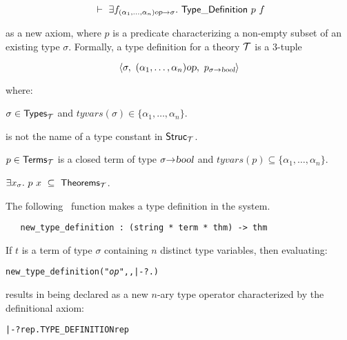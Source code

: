 \[\turn \equant{f_{(\alpha_1,\ldots,\alpha_n)\ty{op}\fun\sigma}}\TyDef\ p\ f\]

\noindent as a new axiom, where $p$ is a predicate
characterizing a
non-empty subset of an existing type $\sigma$.  Formally, a type definition
for a theory ${\cal T}$ is a $3$-tuple

\[ \langle \sigma,\ (\alpha_1,\ldots,\alpha_n)\ty{op},
    \ p_{\sigma\fun\ty{bool}}\rangle \]

\noindent where:

\begin{myenumerate}
\item $\sigma\in{\sf Types}_{\cal T}$  and
$tyvars(\sigma)\in\{\alpha_1, \ldots , \alpha_n\}$.
\item {} is not the name of a type constant in ${\sf Struc}_{\cal T}$.
\item $p\in{\sf Terms}_{\cal T}$ is a closed term of
type $\sigma{\to}\textsl{bool}$  and
$tyvars(p)\subseteq\{\alpha_1, \ldots , \alpha_n\}$.
\item $\exists x_{\sigma}.\ p\ x \ \subseteq\ {\sf Theorems}_{\cal T}$.
\end{myenumerate}

The following \ML\ function makes a type definition in the \HOL{} system.

\begin{holboxed}
\begin{verbatim}
   new_type_definition : (string * term * thm) -> thm
\end{verbatim}\end{holboxed}

\noindent If $t$ is a term of type
$\sigma$ containing $n$ distinct type variables, then
evaluating:

{\def\op{{\normalsize\sl op}}
\begin{hol}\begin{alltt}
   new_type_definition("{\op}", , |- ?.)
\end{alltt}\end{hol}}

\noindent results in  being declared as a new $n$-ary type operator
characterized by the definitional
 axiom:

\begin{hol}\begin{alltt}
   |- ?rep. TYPE\_DEFINITION  rep
\end{alltt}\end{hol}

